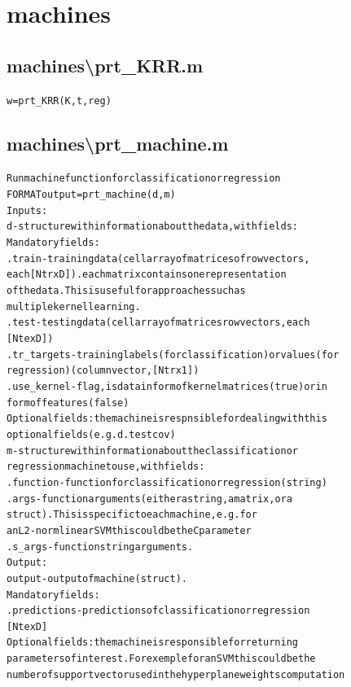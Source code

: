 \section{machines}

\subsection{machines\textbackslash prt\_KRR.m}
\begin{alltt}

 w = prt\_KRR(K,t,reg)
\end{alltt}


\subsection{machines\textbackslash prt\_machine.m}
\begin{alltt}

 Run machine function for classification or regression
 FORMAT output = prt\_machine(d,m)
 Inputs:
   d            - structure with information about the data, with fields:
    Mandatory fields:
    .train      - training data (cell array of matrices of row vectors,
                  each [Ntr x D]). each matrix contains one representation
                  of the data. This is useful for approaches such as
                  multiple kernel learning.
    .test       - testing data  (cell array of matrices row vectors, each
                  [Nte x D])
    .tr\_targets - training labels (for classification) or values (for
                  regression) (column vector, [Ntr x 1])
    .use\_kernel - flag, is data in form of kernel matrices (true) or in 
                  form of features (false)
    Optional fields: the machine is respnsible for dealing with this
                  optional fields (e.g. d.testcov)
   m            - structure with information about the classification or
                  regression machine to use, with fields:
      .function - function for classification or regression (string)
      .args     - function arguments (either a string, a matrix, or a
                  struct). This is specific to each machine, e.g. for
                  an L2-norm linear SVM this could be the C parameter
      .s\_args   - function string arguments.
 Output:
    output      - output of machine (struct).
       Mandatory fields:
       .predictions - predictions of classification or regression
                      [Nte x D]
       Optional fields: the machine is responsible for returning
       parameters of interest. For exemple for an SVM this could be the
       number of support vector used in the hyperplane weights computation
\end{alltt}


